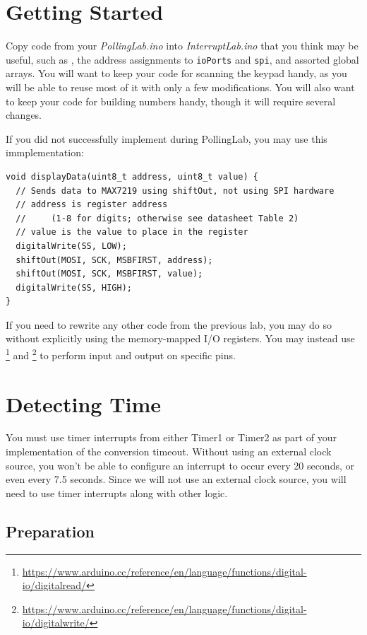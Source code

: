 \section{Getting Started} \label{sec:GettingStarted}

Copy code from your \textit{PollingLab.ino} into \textit{InterruptLab.ino} that
you think may be useful, such as , the address
assignments to \lstinline{ioPorts} and \lstinline{spi}, and assorted global
arrays. You will want to keep your code for scanning the keypad handy, as you
will be able to reuse most of it with only a few modifications. You will also
want to keep your code for building numbers handy, though it will require
several changes.

If you did not successfully implement  during
PollingLab, you may use this immplementation:
\begin{lstlisting}
void displayData(uint8_t address, uint8_t value) {
  // Sends data to MAX7219 using shiftOut, not using SPI hardware
  // address is register address
  //     (1-8 for digits; otherwise see datasheet Table 2)
  // value is the value to place in the register
  digitalWrite(SS, LOW);
  shiftOut(MOSI, SCK, MSBFIRST, address);
  shiftOut(MOSI, SCK, MSBFIRST, value);
  digitalWrite(SS, HIGH);
}
\end{lstlisting}

If you need to rewrite any other code from the previous lab, you may do so
without explicitly using the memory-mapped I/O registers. You may instead use
\footnote{\url{https://www.arduino.cc/reference/en/language/functions/digital-io/digitalread/}}
and \footnote{\url{https://www.arduino.cc/reference/en/language/functions/digital-io/digitalwrite/}}
to perform input and output on specific pins.

\section{Detecting Time}\label{sec:TimerInterrupts}

You must use timer interrupts from either Timer1 or Timer2 as part of your
implementation of the conversion timeout. Without using an external clock source,
you won't be able to configure an interrupt to occur every 20 seconds, or even
every 7.5 seconds. Since we will not use an external clock source, you will need
to use timer interrupts along with other logic.

\subsection{Preparation}

